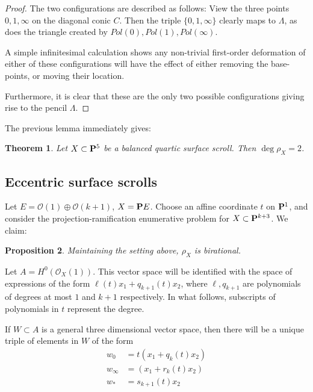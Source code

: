\documentclass[11pt,reqno]{amsart}
\theoremstyle{plain}
\newtheorem{theorem}{Theorem}[section]
\newtheorem{proposition}[theorem]{Proposition}
\theoremstyle{definition}
\theoremstyle{remark}
\numberwithin{equation}{section}
\numberwithin{equation}{section}
\renewcommand{\O}{\mathcal O}
\begin{document}
 \begin{proof}
 	The two configurations are described as follows: View the three points $0,1,\infty$ on the diagonal conic $C$. Then the triple $\{0,1,\infty\}$ clearly maps to $\Lambda$, as does the triangle created by $Pol(0), Pol(1), Pol(\infty)$. 

 	A simple infinitesimal calculation shows any non-trivial first-order deformation of either of these configurations will have the effect of either removing the base-points, or moving their location. 

 	Furthermore, it is clear that these are the only two possible configurations giving rise to the pencil $\Lambda$. 
 \end{proof}

The previous lemma immediately gives:

\begin{theorem}
  	Let $X \subset \P^{5}$ be a balanced quartic surface scroll. Then $\deg \rho_{X} = 2$.
  \end{theorem}  


\subsection{Eccentric surface scrolls} %
\label{sub:surfaces}

Let $E = \O(1) \oplus \O(k+1)$, $X = \P E$. Choose an affine coordinate $t$ on $\P^{1}$, and consider the projection-ramification enumerative problem for $X \subset \P^{k+3}$.  We claim: 
\begin{proposition}\label{proposition:rhobirationalsurfaces}
Maintaining the setting above,	$\rho_{X}$ is birational.
\end{proposition}


Let $A= H^{0}(\O_{X}(1))$. This vector space will be identified with the space of expressions of the form $\ell(t)x_{1} + q_{k+1}(t)x_{2}$, where $\ell, q_{k+1}$ are polynomials of degrees at most $1$ and $k+1$ respectively. In what follows, subscripts of polynomials in $t$ represent the degree.

If $W \subset A$ is a general three dimensional vector space, then there will be a unique triple of elements in $W$ of the form
\begin{align*}
	w_{0} &= t(x_{1} + q_{k}(t)x_{2})\\
	w_{\infty} &= (x_{1} + r_{k}(t)x_{2})\\
	w_{*} &= s_{k+1}(t)x_{2}
\end{align*}
\end{document}
